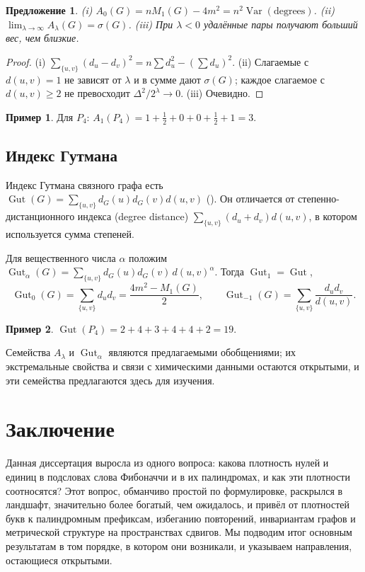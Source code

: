 \documentclass[a4paper,14pt]{extreport}
\theoremstyle{plain}
\newtheorem{proposition}[theorem]{Предложение}
\theoremstyle{definition}
\newtheorem{example}{Пример}
\theoremstyle{remark}
\begin{document}
\begin{proposition}
	(i) $A_0(G)=nM_1(G)-4m^2=n^2\operatorname{Var}(\text{degrees})$. (ii) $\lim_{\lambda\to\infty}A_\lambda(G)=\sigma(G)$. (iii) При $\lambda<0$ удалённые пары получают больший вес, чем близкие.
\end{proposition}
\begin{proof}
	(i) $\sum_{\{u,v\}}(d_u-d_v)^2=n\sum d_u^2-(\sum d_u)^2$. (ii) Слагаемые с $d(u,v)=1$ не зависят от $\lambda$ и в сумме дают $\sigma(G)$; каждое слагаемое с $d(u,v)\ge2$ не превосходит $\Delta^2/2^\lambda\to0$. (iii) Очевидно.
\end{proof}

\begin{example}
	Для $P_4$: $A_1(P_4)=1+\tfrac12+0+0+\tfrac12+1=3$.
\end{example}

\section{Индекс Гутмана}

Индекс Гутмана связного графа есть $\operatorname{Gut}(G)=\sum_{\{u,v\}}d_G(u)d_G(v)d(u,v)$ (\cite{Gutman1994}). Он отличается от степенно-дистанционного индекса (degree distance)
$\sum_{\{u,v\}}(d_u+d_v)d(u,v)$, в котором используется сумма степеней.

Для вещественного числа $\alpha$ положим $\operatorname{Gut}_\alpha(G)=\sum_{\{u,v\}}d_G(u)d_G(v)\,d(u,v)^\alpha$. Тогда $\operatorname{Gut}_1=\operatorname{Gut}$,
\begin{equation}
	\operatorname{Gut}_0(G)=\sum_{\{u,v\}}d_ud_v=\frac{4m^2-M_1(G)}2,\qquad
	\operatorname{Gut}_{-1}(G)=\sum_{\{u,v\}}\frac{d_ud_v}{d(u,v)} .
\end{equation}
\begin{example}
	$\operatorname{Gut}(P_4)=2+4+3+4+4+2=19$.
\end{example}
\noindent Семейства $A_\lambda$ и $\operatorname{Gut}_\alpha$ являются предлагаемыми обобщениями; их экстремальные свойства и связи с химическими данными остаются открытыми, и эти семейства предлагаются здесь для изучения.
\chapter*{Заключение}
Данная диссертация выросла из одного вопроса: какова плотность нулей и единиц в подсловах слова Фибоначчи и в их палиндромах, и как эти плотности соотносятся? Этот вопрос, обманчиво простой по формулировке, раскрылся в ландшафт, значительно более богатый, чем ожидалось, и привёл от плотностей букв к палиндромным префиксам, избеганию повторений, инвариантам графов и метрической структуре на пространствах сдвигов. Мы подводим итог основным результатам в том порядке, в котором они возникали, и указываем направления, остающиеся открытыми.
\end{document}
